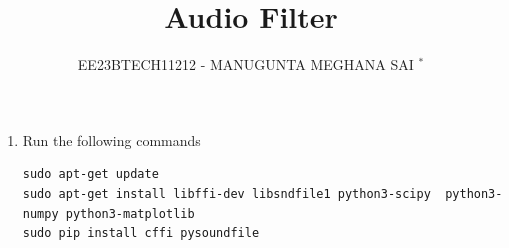 \documentclass[journal,12pt,twocolumn]{IEEEtran}
\theoremstyle{remark}
\begin{document}

\vspace{3cm}
\title{Audio Filter}
\author{EE23BTECH11212 - MANUGUNTA MEGHANA SAI $^{*}$%
}
\maketitle
\newpage
\bigskip
\renewcommand{\thefigure}{\arabic{figure}}
\renewcommand{\thetable}{\theenumi}


\begin{enumerate}[label=\thesection.\arabic*,ref=\thesection.\theenumi]
\section{Software Installation}
\item Run the following commands
\begin{lstlisting}
sudo apt-get update
sudo apt-get install libffi-dev libsndfile1 python3-scipy  python3-numpy python3-matplotlib 
sudo pip install cffi pysoundfile 
\end{lstlisting}
\end{enumerate}
\end{document}

